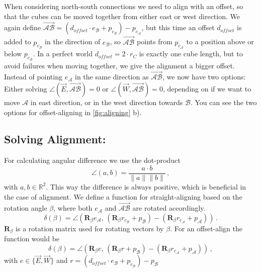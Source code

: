 When considering north-south connections we need to align with an offset, so that the cubes can be moved together from either east or west direction.
We again define $\overrightarrow{\mathcal{A}\mathcal{B}} = \left( d_\textit{offset} \cdot e_\mathcal{B} + p_{c_\mathcal{B}} \right) - p_{c_\mathcal{A}}$, but this time an offset $d_\textit{offset}$ is added to $p_{c_\mathcal{B}}$ in the direction of $e_\mathcal{B}$, so $\overrightarrow{\mathcal{A}\mathcal{B}}$ points from $p_{c_\mathcal{A}}$ to a position above or below $p_{c_\mathcal{B}}$.
In a perfect world $d_\textit{offset} = 2 \cdot r_C$ is exactly one cube length, but to avoid failures when moving together, we give the alignment a bigger offset.
Instead of pointing $e_\mathcal{A}$ in the same direction as $\overrightarrow{\mathcal{A}\mathcal{B}}$, we now have two options:
Either solving $\angle \left( \vec{E}, \overrightarrow{\mathcal{A}\mathcal{B}} \right) = 0$ or $\angle \left( \vec{W}, \overrightarrow{\mathcal{A}\mathcal{B}} \right) = 0$, depending on if we want to move $\mathcal{A}$ in east direction, or in the west direction towards $\mathcal{B}$.
You can see the two options for offset-aligning in \autoref{fig:aligning} b).

\subsection{Solving Alignment:}

For calculating angular difference we use the dot-product
\begin{equation*}
\angle (a,b) = \frac{a \cdot b}{\lVert a \rVert \lVert b \rVert} \,,
\end{equation*}
with $a,b \in \mathbb{R}^2$. This way the difference is always positive, which is beneficial in the case of alignment.
We define a function for straight-aligning based on the rotation angle $\beta$, where both $e_\mathcal{A}$ and $\overrightarrow{\mathcal{A}\mathcal{B}}$ are rotated accordingly.
\begin{equation}
\delta(\beta) = \angle \left( \mathbf{R}_\beta e_\mathcal{A}, \, \left( \mathbf{R}_\beta r_{c_\mathcal{B}} + p_\mathcal{B} \right) - \left( \mathbf{R}_\beta r_{c_\mathcal{A}} + p_\mathcal{A} \right)\right) \,.
\end{equation}
$\mathbf{R}_\beta$ is a rotation matrix used for rotating vectors by $\beta$.
For an offset-align the function would be
\begin{equation}
\delta(\beta) = \angle \left( \mathbf{R}_\beta e, \, \left( \mathbf{R}_\beta r + p_\mathcal{B} \right) - \left( \mathbf{R}_\beta r_{c_\mathcal{A}} + p_\mathcal{A} \right)\right) \,,
\end{equation}
with $e \in \{ \vec{E}, \vec{W}\}$ and $r = \left( d_\textit{offset} \cdot e_\mathcal{B} + p_{c_\mathcal{B}} \right) - p_\mathcal{B}$

